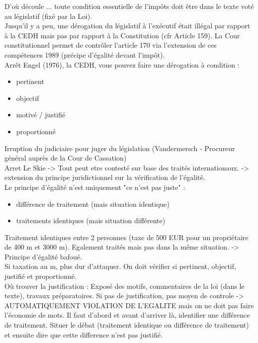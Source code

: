 \documentclass{book}
\begin{document}
D'où découle ... toute condition essentielle de l'impôts doit être dans le texte voté au législatif (fixé par la Loi).\\

Jusqu'il y a peu, une dérogation du législatif à l'exécutif était illégal par rapport à la CEDH mais pas par rapport à la Constitution (cfr Article 159). La Cour constitutionnel permet de contrôler l'article 170 via l'extension de ces compétences 1989 (précipe d'égalité devant l'impôt).\\

Arrêt Engel (1976), la CEDH, vous pouvez faire une dérogation à condition : \\

\begin{itemize}
\item pertinent
\item objectif
\item motivé / justifié
\item proportionné
\end{itemize}
\null
Irruption du judiciaire pour juger du législation (Vandermersch - Procureur général auprès de la Cour de Cassation)\\

Arret Le Skie -> Tout peut etre contesté sur base des traités internationaux. -> extension du principe juridictionnel sur la vérification de l'égalité.\\

Le principe d'égalité n'est uniquement "ce n'est pas juste" :\\

\begin{itemize}
\item différence de traitement (mais situation identique)
\item traitements identiques (mais situation différente)
\end{itemize}
\null
Traitement identiques entre 2 personnes (taxe de 500 EUR pour un propriétaire de 400 m et 3000 m). Egalement traités mais pas dans la même situation. -> Principe d'égalité bafoué.\\

Si taxation au m, plus dur d'attaquer. On doit vérifier si pertinent, objectif, justifié et proportionné.\\

Où trouver la justification : Exposé des motifs, commentaires de la loi (dans le texte), travaux préparatoires. Si pas de justification, pas moyen de controle -> AUTOMATIQUEMENT VIOLATION DE L'EGALITE mais on ne doit pas faire l'économie de mots. Il faut d'abord et avant d'arriver là, identifier une différence de traitement. Situer le débat (traitement identique ou différence de traitement) et ensuite dire que cette difference n'est pas justifié.\\
\end{document}
